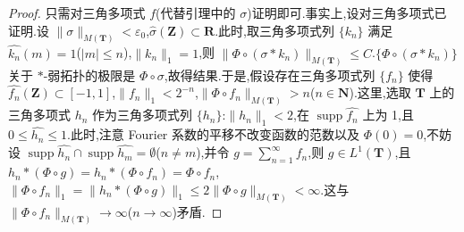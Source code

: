 \begin{proof}
只需对三角多项式 $f$(代替引理中的 $\sigma$)证明即可.事实上,设对三角多项式已证明.设 $\|\sigma\|_{M(\mathbf{T})} < \varepsilon_{0}$,$\widehat{\sigma}(\mathbf{Z}) \subset \mathbf{R}$.此时,取三角多项式列 $\{k_{n}\}$ 满足 $\hat{k_{n}}(m) = 1$($|m| \leq n$),$\|k_{n}\|_{1} = 1$,则 $\|\Phi \circ (\sigma * k_{n})\|_{M(\mathbf{T})} \leq C$.$\{\Phi \circ (\sigma * k_{n})\}$ 关于 $*$-弱拓扑的极限是 $\Phi \circ \sigma$,故得结果.于是,假设存在三角多项式列 $\{f_{n}\}$ 使得 $\widehat{f_{n}}(\mathbf{Z}) \subset [-1, 1]$,$\|f_{n}\|_{1} < 2^{-n}$,$\|\Phi \circ f_{n}\|_{M(\mathbf{T})} > n$($n \in \mathbf{N}$).这里,选取 $\mathbf{T}$ 上的三角多项式 $h_{n}$ 作为三角多项式列 $\{h_{n}\}$:$\|h_{n}\|_{1} < 2$,在 $\operatorname{supp}\widehat{f_{n}}$ 上为 1,且 $0 \leq \widehat{h_{n}} \leq 1$.此时,注意 Fourier 系数的平移不改变函数的范数以及 $\Phi(0) = 0$,不妨设 $\operatorname{supp}\widehat{h_{n}} \cap \operatorname{supp}\widehat{h_{m}} = \emptyset$($n \neq m$),并令 $g = \sum_{n=1}^{\infty}f_{n}$,则 $g \in L^{1}(\mathbf{T})$,且 $h_{n} * (\Phi \circ g) = h_{n} * (\Phi \circ f_{n}) = \Phi \circ f_{n}$,$\|\Phi \circ f_{n}\|_{1} = \|h_{n} * (\Phi \circ g)\|_{1} \leq 2\|\Phi \circ g\|_{M(\mathbf{T})} < \infty$.这与 $\|\Phi \circ f_{n}\|_{M(\mathbf{T})} \to \infty$($n \to \infty$)矛盾.
\end{proof}

